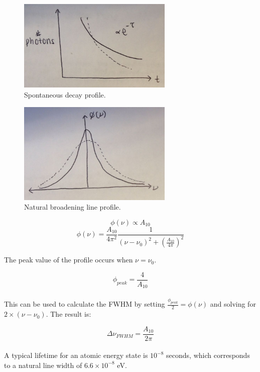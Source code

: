 \documentclass{article}
\begin{document}
\begin{figure}[ht]
    \centering
    \includegraphics[width=0.66\textwidth]{figures/decay.jpg}
    \caption{Spontaneous decay profile.}
    \label{fig:decay}
\end{figure}

\begin{figure}[ht]
    \centering
    \includegraphics[width=0.66\textwidth]{figures/natural.jpg}
    \caption{Natural broadening line profile.}
    \label{fig:natural}
\end{figure}


$$\phi(\nu) \propto A_{10}$$
$$\phi(\nu) = {\frac{A_{10}}{4\pi^{2}}}{\frac{1}{(\nu-\nu_{0})^{2}+({\frac{A_{10}}{4\pi}})^{2}}}$$

The peak value of the profile occurs when $\nu =\nu_{0}$.

$$\phi_{peak} = {\frac{4}{A_{10}}}$$ \\

This can be used to calculate the FWHM by setting ${\frac{\phi_{peak}}{2}} = \phi(\nu)$ and solving for $2\times (\nu-\nu_{0})$. The result is:

$$\Delta\nu_{FWHM} = {\frac{A_{10}}{2\pi}}$$\\

A typical lifetime for an atomic energy state is $10^{-8}$ seconds, which corresponds to a natural line width of $6.6 \times 10^{-8}$ eV.\\
\end{document}
